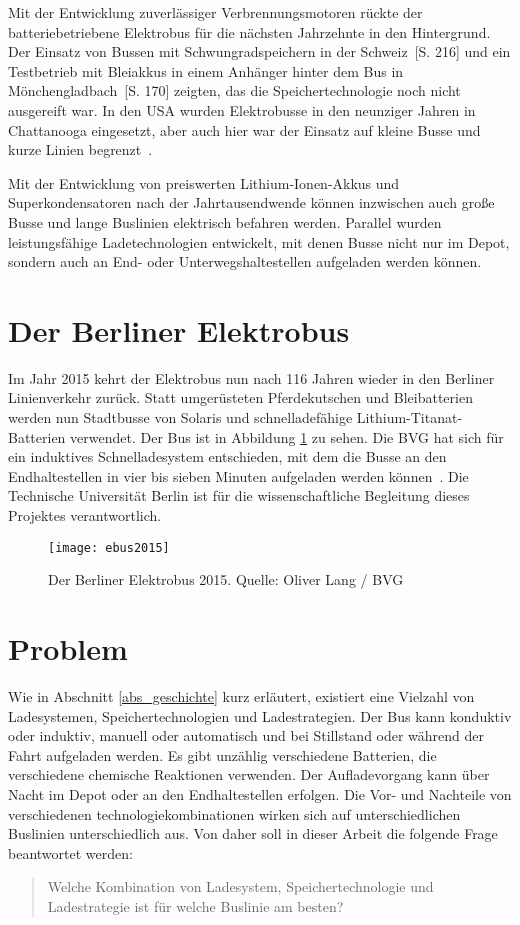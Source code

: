 Mit der Entwicklung zuverlässiger Verbrennungsmotoren rückte der batteriebetriebene Elektrobus für die nächsten Jahrzehnte in den Hintergrund. Der Einsatz von Bussen mit Schwungradspeichern in der Schweiz~\cite{tub_aleph001746639}[S. 216] und ein Testbetrieb mit Bleiakkus in einem Anhänger hinter dem Bus in Mönchengladbach~\cite{tub_aleph001746639}[S. 170] zeigten, das die Speichertechnologie noch nicht ausgereift war. In den USA wurden  Elektrobusse in den neunziger Jahren in Chattanooga eingesetzt, aber auch hier war der Einsatz auf kleine Busse und kurze Linien begrenzt~\cite{chattanoogaDOE}.

Mit der Entwicklung von preiswerten Lithium-Ionen-Akkus und Superkondensatoren nach der Jahrtausendwende können inzwischen auch große Busse und lange Buslinien elektrisch befahren werden. Parallel wurden leistungsfähige Ladetechnologien entwickelt, mit denen Busse nicht nur im Depot, sondern auch an End- oder Unterwegshaltestellen aufgeladen werden können.

\section{Der Berliner Elektrobus}
Im Jahr 2015 kehrt der Elektrobus nun nach 116 Jahren wieder in den Berliner Linienverkehr zurück. Statt umgerüsteten Pferdekutschen und Bleibatterien werden nun Stadtbusse von Solaris und schnelladefähige Lithium-Titanat-Batterien verwendet. Der Bus ist in Abbildung \ref{abb_ebus2015} zu sehen. Die BVG hat sich für ein induktives Schnelladesystem entschieden, mit dem die Busse an den Endhaltestellen in vier bis sieben Minuten aufgeladen werden können~\cite{ebus2015}. Die Technische Universität Berlin ist für die wissenschaftliche Begleitung dieses Projektes verantwortlich.

\begin{figure}\centering
	\texttt{[image: ebus2015]}
	\caption[Der Berliner Elektrobus 2015]{Der Berliner Elektrobus 2015. Quelle: Oliver Lang / BVG}
	\label{abb_ebus2015}
\end{figure}

\section{Problem}
\label{abs_problem}
Wie in Abschnitt \ref{abs_geschichte} kurz erläutert, existiert eine Vielzahl von Ladesystemen, Speichertechnologien und Ladestrategien. Der Bus kann konduktiv oder induktiv, manuell oder automatisch und bei Stillstand oder während der Fahrt aufgeladen werden. Es gibt unzählig verschiedene Batterien, die verschiedene chemische Reaktionen verwenden. Der Aufladevorgang kann über Nacht im Depot oder an den Endhaltestellen erfolgen. Die Vor- und Nachteile von verschiedenen technologiekombinationen wirken sich auf unterschiedlichen Buslinien unterschiedlich aus. Von daher soll in dieser Arbeit die folgende Frage beantwortet werden:
\begin{quote}
	Welche Kombination von Ladesystem, Speichertechnologie und Ladestrategie ist für welche Buslinie am besten?
\end{quote}

